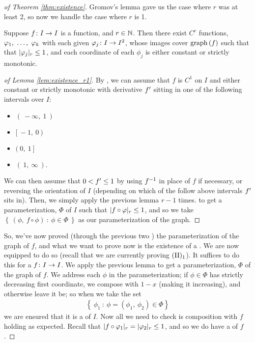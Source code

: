 \begin{proof}[of Theorem \ref{thm:existence}]
    Gromov's lemma gave us the case where $r$ was at least 2, so now we handle the case where $r$ is 1.

    \begin{lemma}
      Suppose $\funcdom{f}{I}{I}$ is a  function, and $r \in \N$. Then there exist  $C^r$ functions, $\vonevm{\phi}{k}$ with each given $\funcdom{\phi_j}{I}{I^2}$, whose images cover $\graph{f}$ such that that $\rnorm{\phi_j} \leq 1$, and each coordinate of each $\phi_j$ is either constant or strictly monotonic.
      \label{lem:existence_r1}
    \end{lemma}

    \begin{proof}[of Lemma \ref{lem:existence_r1}]
      By \sm, we can assume that $f$ is $C^1$ on $I$ and either constant or strictly monotonic with derivative $\pri{f}$ sitting in one of the following intervals over $I$:
        \begin{itemize}
          \item  $(\ - \infty, \ 1 \ )$
          \item  $[\ -1, \ 0 \ )$
          \item  $( \ 0, \ 1 \ ]$
          \item  $( \ 1, \ \infty \ )$.
        \end{itemize}
      We can then assume that $0 < \pri{f} \leq 1$ by using $\inv{f}$ in place of $f$ if necessary, or reversing the orientation of $I$ (depending on which of the follow above intervals $\pri{f}$ sits in). Then, we simply apply the previous lemma $r - 1$ times. to get a parameterization, $\Phi$ of $I$ such that $\rnorm{f \circ \phi} \leq 1$, and so we take $\left\{ \ (\phi, \ f \circ \phi) \ \colon \ \phi \in \Phi \ \right\}$ as our parameterization of the graph.
    \end{proof}

    So, we've now proved (through the previous two \lemmas) the parameterization of the graph of $f$, and what we want to prove now is the existence of a \cellrparam. We are now equipped to do so (recall that we are currently proving $\IIn[1]$). It suffices to do this for a  $\funcdom{f}{I}{I}$. We apply the previous lemma to get a parameterization, $\Phi$ of the graph of $f$. We address each $\phi$ in the parameterization; if $\phi \in \Phi$ has strictly decreasing first coordinate, we compose with $1 - x$ (making it increasing), and otherwise leave it be; so when we take the set
      \begin{align*}
        \left\{ \ \phi_1 \ \colon \ \phi = (\phi_1, \ \phi_2) \in \Phi \right\}
      \end{align*}
    we are ensured that it is a \cellrparam of $I$. Now all we need to check is composition with $f$ holding as expected. Recall that $\rnorm{f \circ \phi_1} = \rnorm{\phi_2} \leq 1$, and so we do have a \cellrparam of $f$.


\end{proof}
